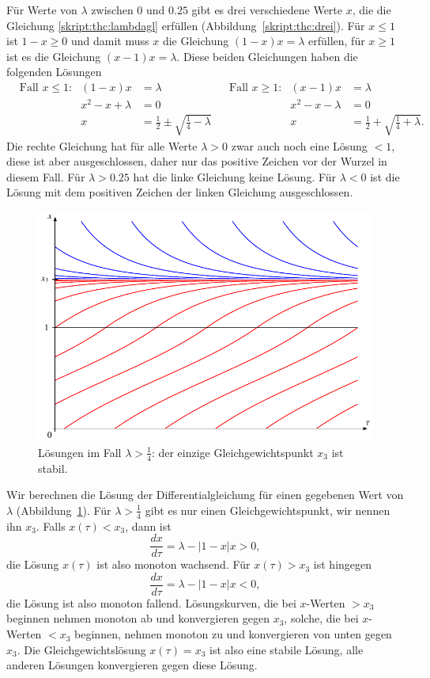 Für Werte von $\lambda$ zwischen $0$ und $0.25$ gibt es drei verschiedene
Werte $x$, die die Gleichung \eqref{skript:thc:lambdagl} erfüllen
(Abbildung~\ref{skript:thc:drei}).
Für $x\le 1$  ist $1-x\ge 0$ und damit muss $x$ die 
Gleichung $(1-x)x=\lambda$ erfüllen, für $x\ge 1$ ist es die Gleichung
$(x-1)x=\lambda$.
Diese beiden Gleichungen haben die folgenden Lösungen
\begin{align*}
&\text{Fall $x \le 1$:}
&
(1-x)x&=\lambda
&
&\text{Fall $x\ge 1$:}
&
(x-1)x&=\lambda
\\
&&
x^2-x+\lambda&=0
&&&
x^2-x-\lambda&=0
\\
&&
x&=\frac12\pm\sqrt{\frac14-\lambda}
&&&
x&=\frac12+\sqrt{\frac14+\lambda}.
\end{align*}
Die rechte Gleichung hat für alle Werte $\lambda > 0$ zwar auch noch
eine Lösung $<1$, diese ist aber ausgeschlossen, daher nur das
positive Zeichen vor der Wurzel in diesem Fall.
Für $\lambda > 0.25$ hat die linke Gleichung keine Lösung.
Für $\lambda < 0$ ist die Lösung mit dem positiven Zeichen der linken
Gleichung ausgeschlossen.

\begin{figure}
\centering
\includegraphics{chapters/4/ein.pdf}
\caption{Lösungen im Fall $\lambda > \frac14$: der einzige
Gleichgewichtspunkt $x_3$ ist stabil.
\label{skript:thc:ein}}
\end{figure}%
Wir berechnen die Lösung der Differentialgleichung für einen gegebenen
Wert von $\lambda$ (Abbildung~\ref{skript:thc:ein}).
Für $\lambda >\frac14$ gibt es nur einen Gleichgewichtspunkt, wir 
nennen ihn $x_3$.
Falls $x(\tau)<x_3$, dann ist
\[
\frac{dx}{d\tau}
=
\lambda - |1-x|x > 0,
\]
die Lösung $x(\tau)$ ist also monoton wachsend.
Für $x(\tau) > x_3$ ist hingegen
\[
\frac{dx}{d\tau}
=
\lambda - |1-x|x < 0,
\]
die Lösung ist also monoton fallend.
Lösungskurven, die bei $x$-Werten $>x_3$ beginnen nehmen monoton ab
und konvergieren gegen $x_3$, solche, die bei $x$-Werten $<x_3$ beginnen,
nehmen monoton zu und konvergieren von unten gegen $x_3$.
Die Gleichgewichtslösung $x(\tau)=x_3$ ist also eine stabile Lösung,
alle anderen Lösungen konvergieren gegen diese Lösung.


